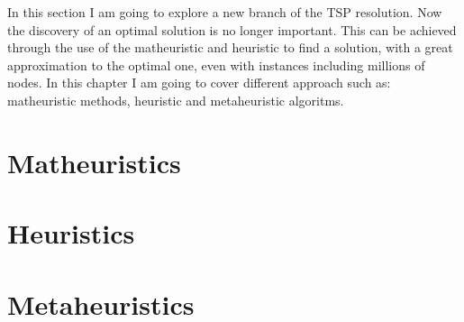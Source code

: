 In this section I am going to explore a new branch of the TSP resolution. Now the discovery of an optimal solution is no longer important. This can be achieved through the use of the matheuristic and heuristic to find a solution, with a great approximation to the optimal one, even with instances including millions of nodes. In this chapter I am going to cover different approach such as: matheuristic methods, heuristic and metaheuristic algoritms.


\section{Matheuristics}


\section{Heuristics}


\section{Metaheuristics}
\label{chapter:metaheuristics}
